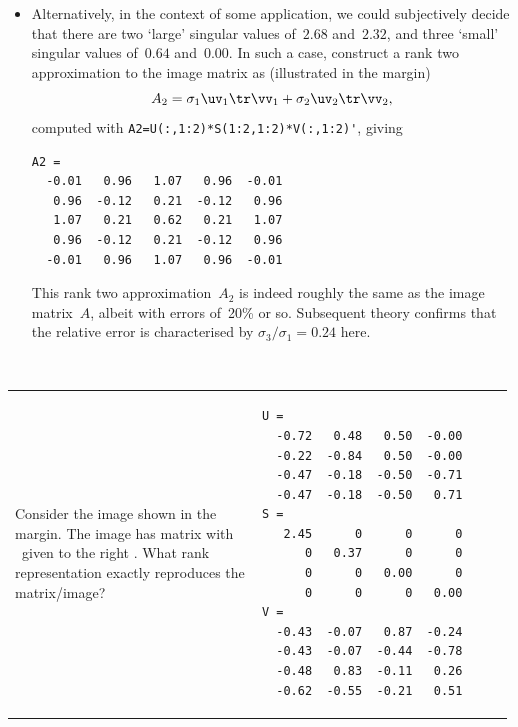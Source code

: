 \begin{example}
\begin{solution}
\begin{itemize}
\item Alternatively, in the context of some application, we could subjectively decide that there are two `large' singular values of~\(2.68\) and~\(2.32\), and three `small' singular values of~\(0.64\) and~\(0.00\).
In such a case, construct a rank two approximation to the image matrix as (illustrated in the margin)
\marginpar{}
\begin{equation*}
A_2=\sigma_1\uv_1\tr\vv_1+\sigma_2\uv_2\tr\vv_2,
\end{equation*}
computed with \verb|A2=U(:,1:2)*S(1:2,1:2)*V(:,1:2)'|, giving \twodp
\begin{verbatim}
A2 =
  -0.01   0.96   1.07   0.96  -0.01
   0.96  -0.12   0.21  -0.12   0.96
   1.07   0.21   0.62   0.21   1.07
   0.96  -0.12   0.21  -0.12   0.96
  -0.01   0.96   1.07   0.96  -0.01
\end{verbatim}
This rank two approximation~\(A_2\) is indeed roughly the same as the image matrix~\(A\), albeit with errors of~20\% or so.
Subsequent theory confirms that the relative error is characterised by \(\sigma_3/\sigma_1=0.24\) here.
\end{itemize}
\end{solution}
\end{example}




\begin{activity}\ 
\marginpar{}%
\\
\begin{tabular}{@{}p{0.49\linewidth}p{0.5\linewidth}@{}}
Consider the image shown in the margin.
The image has matrix with \svd\ given to the right \twodp.
What rank representation exactly reproduces the matrix\slash image?
\actposs[4]2134
&
\begin{verbatim}
U =
  -0.72   0.48   0.50  -0.00
  -0.22  -0.84   0.50  -0.00
  -0.47  -0.18  -0.50  -0.71
  -0.47  -0.18  -0.50   0.71
S =
   2.45      0      0      0
      0   0.37      0      0
      0      0   0.00      0
      0      0      0   0.00
V =
  -0.43  -0.07   0.87  -0.24
  -0.43  -0.07  -0.44  -0.78
  -0.48   0.83  -0.11   0.26
  -0.62  -0.55  -0.21   0.51
\end{verbatim}
\end{tabular}
\end{activity}




